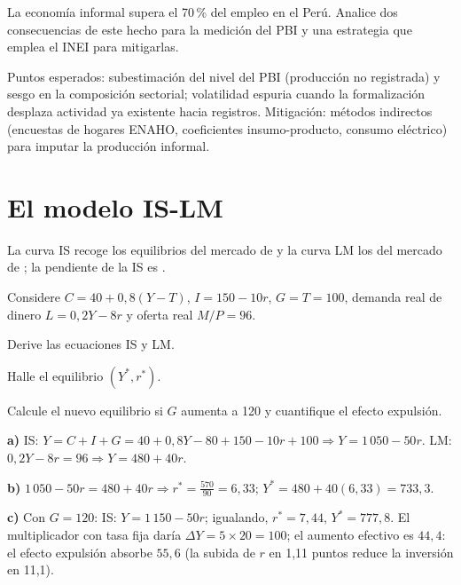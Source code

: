 \documentclass[claves]{academic-exam}
\begin{document}
\begin{pregunta}[][An · Desarrollo]
La economía informal supera el 70\,\% del empleo en el Perú. Analice dos
consecuencias de este hecho para la medición del PBI y una estrategia que
emplea el INEI para mitigarlas.
\begin{solucion}
Puntos esperados: subestimación del nivel del PBI (producción no
registrada) y sesgo en la composición sectorial; volatilidad espuria
cuando la formalización desplaza actividad ya existente hacia registros.
Mitigación: métodos indirectos (encuestas de hogares ENAHO, coeficientes
insumo-producto, consumo eléctrico) para imputar la producción informal.
\end{solucion}
\end{pregunta}

\section{El modelo IS-LM}

\begin{pregunta}[][R · Completar]
La curva IS recoge los equilibrios del mercado de
\completar[bienes]{2.8cm} y la curva LM los del mercado de
\completar[dinero]{2.8cm}; la pendiente de la IS es
\completar[negativa]{2.8cm}.
\end{pregunta}

\begin{pregunta}[][A · Problema]
Considere $C = 40 + 0{,}8(Y - T)$, $I = 150 - 10r$, $G = T = 100$,
demanda real de dinero $L = 0{,}2Y - 8r$ y oferta real $M/P = 96$.
\begin{apartados}
  \item Derive las ecuaciones IS y LM. 
  \item Halle el equilibrio $(Y^{*}, r^{*})$. 
  \item Calcule el nuevo equilibrio si $G$ aumenta a 120 y cuantifique el
        efecto expulsión. 
\end{apartados}
\begin{solucion}
\textbf{a)} IS: $Y = C+I+G = 40+0{,}8Y-80+150-10r+100
\Rightarrow Y = 1\,050 - 50r$.
LM: $0{,}2Y - 8r = 96 \Rightarrow Y = 480 + 40r$.

\textbf{b)} $1\,050 - 50r = 480 + 40r \Rightarrow r^{*} = \frac{570}{90}
= 6{,}33$; $Y^{*} = 480+40(6{,}33) = 733{,}3$.

\textbf{c)} Con $G=120$: IS: $Y = 1\,150 - 50r$; igualando,
$r^{*} = 7{,}44$, $Y^{*} = 777{,}8$. El multiplicador con tasa fija
daría $\Delta Y = 5\times20 = 100$; el aumento efectivo es $44{,}4$:
el efecto expulsión absorbe $55{,}6$ (la subida de $r$ en 1,11 puntos
reduce la inversión en 11,1).
\end{solucion}
\end{pregunta}
\end{document}
